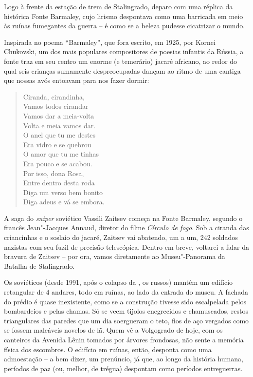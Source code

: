 Logo à frente da estação de trem de Stalingrado, deparo com uma réplica
da histórica Fonte Barmaley, cujo lirismo despontava como uma barricada
em meio às ruínas fumegantes da guerra -- é como se a beleza pudesse
cicatrizar o mundo.

Inspirada no poema ``Barmaley'', que fora escrito, em 1925, por Kornei
Chukovski, um dos mais populares compositores de poesias infantis da
Rússia, a fonte traz em seu centro um enorme (e temerário) jacaré
africano, ao redor do qual seis crianças sumamente despreocupadas dançam
ao ritmo de uma cantiga que nossas avós entoavam para nos fazer dormir:

\begin{verse}
Ciranda, cirandinha,\\
Vamos todos cirandar\\
Vamos dar a meia-volta\\
Volta e meia vamos dar.\\[5pt]
O anel que tu me destes\\
Era vidro e se quebrou\\
O amor que tu me tinhas\\
Era pouco e se acabou.\\[5pt]
Por isso, dona Rosa,\\
Entre dentro desta roda\\
Diga um verso bem bonito\\
Diga adeus e vá se embora.
\end{verse}

A saga do \emph{sniper} soviético Vassili Zaitsev começa na Fonte
Barmaley, segundo o francês Jean"-Jacques Annaud, diretor do filme
\emph{Círculo de fogo}. Sob a ciranda das criancinhas e o soslaio do
jacaré, Zaitsev vai abatendo, um a um, 242 soldados nazistas com seu
fuzil de precisão telescópica. Dentro em breve, voltarei a falar da
bravura de Zaitsev -- por ora, vamos diretamente ao Museu"-Panorama da
Batalha de Stalingrado.

Os soviéticos (desde 1991, após o colapso da , os russos) mantêm um
edifício retangular de 4 andares, todo em ruínas, ao lado da entrada do
museu. A fachada do prédio é quase inexistente, como se a construção
tivesse sido escalpelada pelos bombardeios e pelas chamas. Só se veem
tijolos enegrecidos e chamuscados, restos triangulares das paredes que
um dia soergueram o teto, fios de aço vergados como se fossem maleáveis
novelos de lã. Quem vê a Volgogrado de hoje, com os canteiros da Avenida
Lênin tomados por árvores frondosas, não sente a memória física dos
escombros. O edifício em ruínas, então, desponta como uma admoestação --
a bem dizer, um prenúncio, já que, ao longo da história humana, períodos
de paz (ou, melhor, de trégua) despontam como períodos entreguerras.

